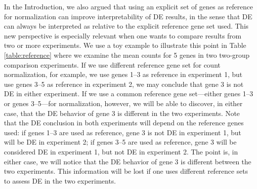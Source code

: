 \documentclass[letterpaper,12pt]{article}
\begin{document}
In the Introduction, we also argued that using an explicit set of genes as
reference for normalization can improve interpretability of DE results, in the
sense that DE can always be interpreted as relative to the explicit reference
gene set used. This new perspective is especially relevant when one wants to compare results from two
or more experiments.
We use a toy example to illustrate this point in
Table \ref{table:reference} where we examine the mean counts for 5 genes in two
two-group comparison experiments. If we use different reference gene set for
count normalization, for example, we use genes 1--3 as reference in experiment
1, but use genes 3--5 as reference in experiment 2, we may conclude that gene
3 is not DE in either experiment. If we use a common reference gene
set---either genes 1--3 or genes 3--5---for normalization, however, we will be
able to discover, in either case, that the DE behavior of gene 3 is different
in the two experiments. Note that the DE conclusion in both
experiments will depend on the reference genes used: if genes 1--3 are used as
reference, gene 3 is not DE in experiment 1, but will be DE in experiment 2;
if genes 3--5 are used as reference, gene 3 will be considered DE in
experiment 1, but not DE in experiment 2. The point is, in either case, we
will notice that the DE behavior of gene 3 is different between the two
experiments. This information will be lost if one uses different reference
sets to assess DE in the two experiments.
\end{document}
